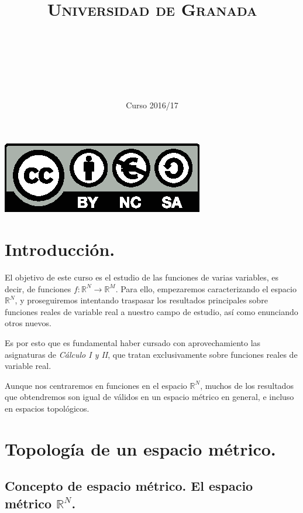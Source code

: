 \documentclass[11pt, a4paper, titlepage]{article}
\title{
  \normalfont \normalsize 
  \textsc{Universidad de Granada} \\ [25pt]    %
  \horrule{0.5pt} \\[0.4cm] %
  \huge \subject\\ %
  \horrule{2pt} \\[0.5cm] %
}
\author{\Large{\docauthor}}
\date{\vspace{-1.5em} \normalsize Curso 2016/17}
\theoremstyle{theorem-style}
\theoremstyle{definition-style}
\theoremstyle{remark-style}
\theoremstyle{example-style}
\begin{document}
\maketitle  %
\tableofcontents    %
\vfill
\begin{center}
\includegraphics{../Recursos/Plantillas/by-nc-sa.eps}  %
\end{center}
\newpage

\section*{Introducción.}

El objetivo de este curso es el estudio de las funciones de varias variables, es decir, de funciones $f: \mathbb{R}^N \longrightarrow \mathbb{R}^M$. Para ello, empezaremos caracterizando el espacio $\mathbb{R}^N$, y proseguiremos intentando traspasar los resultados principales sobre funciones reales de variable real a nuestro campo de estudio, así como enunciando otros nuevos.

Es por esto que es fundamental haber cursado con aprovechamiento las asignaturas de \emph{Cálculo I y II}, que tratan exclusivamente sobre funciones reales de variable real.

Aunque nos centraremos en funciones en el espacio $\mathbb{R}^N$, muchos de los resultados que obtendremos son igual de válidos en un espacio métrico en general, e incluso en espacios topológicos.

\newpage


\section{Topología de un espacio métrico.}

\subsection{Concepto de espacio métrico. El espacio métrico $\mathbb{R}^N$.}
\end{document}
